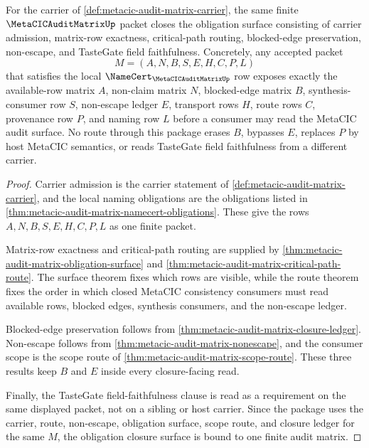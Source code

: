 \begin{theorem}
\label{thm:metacic-audit-matrix-obligation-closure-package}
For the carrier of \autoref{def:metacic-audit-matrix-carrier}, the same finite $\MetaCICAuditMatrixUp$ packet closes the obligation surface consisting of carrier admission, matrix-row exactness, critical-path routing, blocked-edge preservation, non-escape, and TasteGate field faithfulness. Concretely, any accepted packet
$$
M=(A,N,B,S,E,H,C,P,L)
$$
that satisfies the local $\NameCert_{\MetaCICAuditMatrixUp}$ row exposes exactly the available-row matrix $A$, non-claim matrix $N$, blocked-edge matrix $B$, synthesis-consumer row $S$, non-escape ledger $E$, transport rows $H$, route rows $C$, provenance row $P$, and naming row $L$ before a consumer may read the MetaCIC audit surface. No route through this package erases $B$, bypasses $E$, replaces $P$ by host MetaCIC semantics, or reads TasteGate field faithfulness from a different carrier.
\end{theorem}
\begin{proof}
Carrier admission is the carrier statement of \autoref{def:metacic-audit-matrix-carrier}, and the local naming obligations are the obligations listed in \autoref{thm:metacic-audit-matrix-namecert-obligations}. These give the rows $A,N,B,S,E,H,C,P,L$ as one finite packet.

Matrix-row exactness and critical-path routing are supplied by \autoref{thm:metacic-audit-matrix-obligation-surface} and \autoref{thm:metacic-audit-matrix-critical-path-route}. The surface theorem fixes which rows are visible, while the route theorem fixes the order in which closed MetaCIC consistency consumers must read available rows, blocked edges, synthesis consumers, and the non-escape ledger.

Blocked-edge preservation follows from \autoref{thm:metacic-audit-matrix-closure-ledger}. Non-escape follows from \autoref{thm:metacic-audit-matrix-nonescape}, and the consumer scope is the scope route of \autoref{thm:metacic-audit-matrix-scope-route}. These three results keep $B$ and $E$ inside every closure-facing read.

Finally, the TasteGate field-faithfulness clause is read as a requirement on the same displayed packet, not on a sibling or host carrier. Since the package uses the carrier, route, non-escape, obligation surface, scope route, and closure ledger for the same $M$, the obligation closure surface is bound to one finite audit matrix.
\end{proof}

